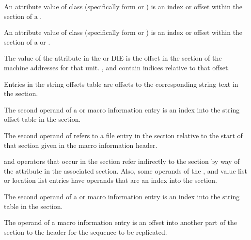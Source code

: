 \begin{description}
An attribute value of class \CLASSrnglist{}
(specifically form \DWFORMrnglistx{} or \DWFORMsecoffset)
is an index or offset within the \dotdebugrnglists{}
section of a .

An attribute value of class \CLASSloclist{}
(specifically form \DWFORMloclistx{} or \DWFORMsecoffset)
is an index or offset within the \dotdebugloclists{}
section of a
\bb
{} or
\eb
{}.

The value of the \DWATaddrbase{} attribute in the
\DWTAGcompileunit{} or \DWTAGpartialunit{} DIE is the
offset in the \dotdebugaddr{} section of the machine
addresses for that unit.
\DWFORMaddrxXN, \DWOPaddrx{} and \DWOPconstx{} contain
indices relative to that offset.

Entries in the string offsets table
are offsets to the corresponding string text in the
\dotdebugstr{} section.

The second operand of a
\DWMACROdefinestrx{} or \DWMACROundefstrx{}
macro information entry is an index
into the string offset table in the
\dotdebugstroffsets{} section.

The second operand of
\DWMACROstartfile{} refers to a file entry in the
\dotdebugline{} section relative to the start
of that section given in the macro information header.

\DWOPaddrx{} and \DWOPconstx{} operators that occur in the
\dotdebugloclists{} section refer indirectly to the
\dotdebugaddr{} section by way of the
\DWATaddrbase{} attribute in the associated \dotdebuginfo{}
section.
\bb
Also, some operands of the \DWLLEbaseaddressx, \DWLLEstartxendx{}
and \DWLLEstartxlength{} value list or
location list entries have operands that
are an index into the \dotdebugaddr{} section.
\eb

The second operand of a
\DWMACROdefinestrp{} or \DWMACROundefstrp{} macro information
entry is an index into the string table in the
\dotdebugstr{} section.

The operand of a
\DWMACROimport{} macro information
entry is an offset into another part of the
\dotdebugmacro{} section to the header for the
sequence to be replicated.


\end{description}
